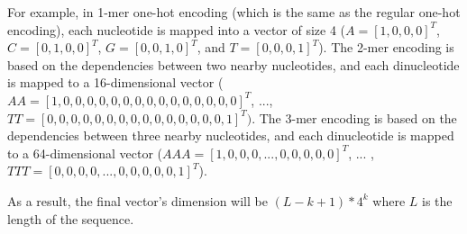 For example, in 1-mer one-hot encoding (which is the same as the regular one-hot encoding), each nucleotide is mapped into a vector of size 4 ($A = [1, 0, 0, 0]^{T}$, $C = [0, 1, 0, 0]^{T}$, $G = [0, 0, 1, 0]^{T}$, and $T = [0, 0, 0, 1]^{T}$). The 2-mer encoding is based on the dependencies between two nearby nucleotides, and each dinucleotide is mapped to a 16-dimensional vector ($AA = [1, 0, 0, 0, 0, 0, 0, 0, 0, 0, 0, 0, 0, 0, 0, 0]^{T}$, ..., $TT = [0, 0, 0, 0, 0, 0, 0, 0, 0, 0, 0, 0, 0, 0, 0, 1]^{T})$. The 3-mer encoding is based on the dependencies between three nearby nucleotides, and each dinucleotide is mapped to a 64-dimensional vector ($AAA = [1, 0, 0, 0, ..., 0, 0, 0, 0, 0]^{T}$, ... , $TTT = [0, 0, 0, 0, ..., 0, 0, 0, 0, 0, 1]^{T}$).

As a result, the final vector's dimension will be $(L - k + 1) * 4^{k}$ where $L$ is the length of the sequence.